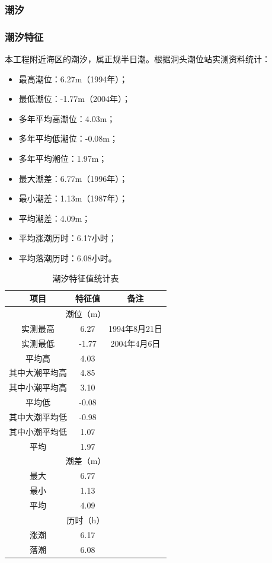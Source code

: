 \documentclass[UTF8, a4paper, 12pt]{ctexart} %
\begin{document}
\subsubsection{潮汐}

\subsubsection{潮汐特征}
本工程附近海区的潮汐，属正规半日潮。根据洞头潮位站实测资料统计：
\begin{itemize}
    \item 最高潮位：6.27m（1994年）；
    \item 最低潮位：-1.77m（2004年）；
    \item 多年平均高潮位：4.03m；
    \item 多年平均低潮位：-0.08m；
    \item 多年平均潮位：1.97m；
    \item 最大潮差：6.77m（1996年）；
    \item 最小潮差：1.13m（1987年）；
    \item 平均潮差：4.09m；
    \item 平均涨潮历时：6.17小时；
    \item 平均落潮历时：6.08小时。
\end{itemize}
\begin{table}[h]
    \centering
    \caption{潮汐特征值统计表}
    \begin{tabular}{|c|c|c|}
        \hline
        项目 & 特征值 & 备注 \\ \hline
        \multicolumn{3}{|c|}{潮位（m）} \\ \hline
        实测最高 & 6.27 & 1994年8月21日 \\ \hline
        实测最低 & -1.77 & 2004年4月6日 \\ \hline
        平均高 & 4.03 & \\ \hline
        其中大潮平均高 & 4.85 & \\ \hline
        其中小潮平均高 & 3.10 & \\ \hline
        平均低 & -0.08 & \\ \hline
        其中大潮平均低 & -0.98 & \\ \hline
        其中小潮平均低 & 1.07 & \\ \hline
        平均 & 1.97 & \\ \hline
        \multicolumn{3}{|c|}{潮差（m）} \\ \hline
        最大 & 6.77 & \\ \hline
        最小 & 1.13 & \\ \hline
        平均 & 4.09 & \\ \hline
        \multicolumn{3}{|c|}{历时（h）} \\ \hline
        涨潮 & 6.17 & \\ \hline
        落潮 & 6.08 & \\ \hline
    \end{tabular}
    \label{tab:tide_characteristics}
\end{table}
\newpage
\end{document}
